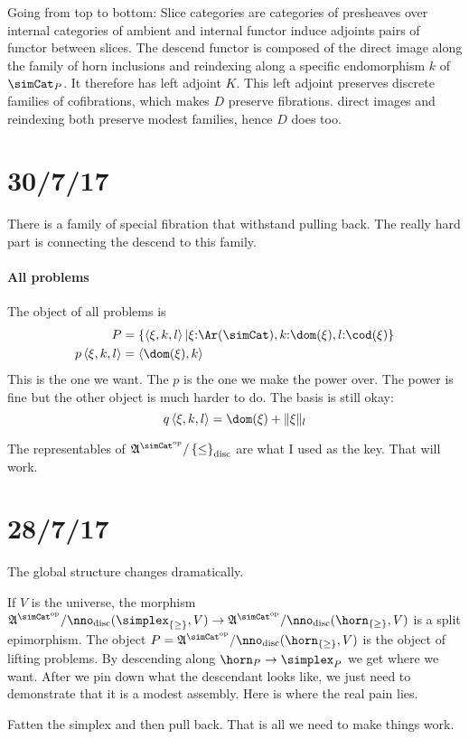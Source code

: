 \documentclass[csh.tex]{subfiles}
\begin{document}
Going from top to bottom:
Slice categories are categories of presheaves over internal categories of ambient and internal functor induce adjoints pairs of functor between slices.
The descend functor is composed of the direct image along the family of horn inclusions and reindexing along a specific endomorphism $k$ of $\simCat_P$. 
It therefore has left adjoint $K$. This left adjoint preserves discrete families of cofibrations, which makes $D$ preserve fibrations. direct images and reindexing both preserve modest families, hence $D$ does too.
\section{30/7/17}

There is a family of special fibration that withstand pulling back. The really hard part is connecting the descend to this family.

\paragraph{All problems}
The object of all problems is 
\begin{align*} 
P &= \set{\tuplet{\xi,k,l}|\xi\of\Ar(\simCat),k\of\dom(\xi),l\of\cod(\xi)}\\
p\tuplet{\xi,k,l} &= \tuplet{\dom(\xi),k}
\end{align*}
This is the one we want. The $p$ is the one we make the power over. The power is fine but the other object is much harder to do. The basis is still okay:
\[ q\tuplet{\xi,k,l} = \dom(\xi)+\norm\xi_l \]

The representables of $\ambient\s/\set\leq\disc$ are what I used as the key. That will work.

\section{28/7/17}
The global structure changes dramatically.

If $V$ is the universe, the morphism $\ambient\s/\nno\disc(\simplex_{\set\geq},V)\to \ambient\s/\nno\disc(\horn_{\set\geq},V)$ is a split epimorphism. 
The object $P=\ambient\s/\nno\disc(\horn_{\set\geq},V)$ is the object of lifting problems. By descending along $\horn_P\to \simplex_P$ we get where we want.
After we pin down what the descendant looks like, we just need to demonstrate that it is a modest assembly.
Here is where the real pain lies.

Fatten the simplex and then pull back. That is all we need to make things work.
\end{document}
